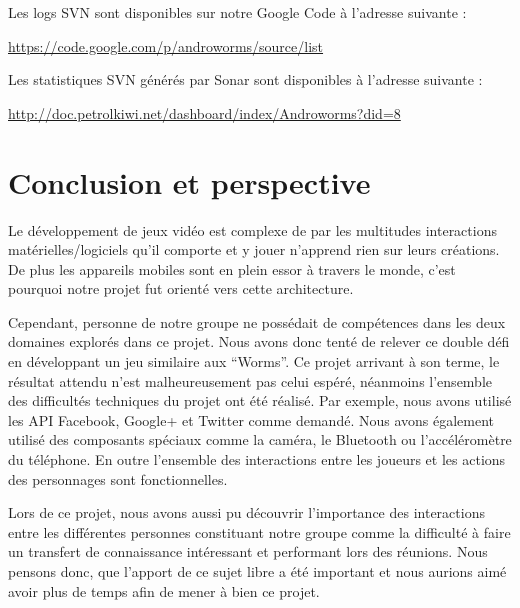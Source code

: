 \documentclass{report}
\begin{document}
Les logs SVN sont disponibles sur notre Google Code à l’adresse suivante :

\url{https://code.google.com/p/androworms/source/list}

\bigskip

Les statistiques SVN générés par Sonar sont disponibles à l’adresse suivante :

\url{http://doc.petrolkiwi.net/dashboard/index/Androworms?did=8}


\newpage

\section{Conclusion et perspective}
\bigskip


Le développement de jeux vidéo est complexe de par les multitudes
interactions matérielles/logiciels qu’il comporte et y jouer n’apprend
rien sur leurs créations. De plus les appareils mobiles sont en plein
essor à travers le monde, c’est pourquoi notre projet fut orienté vers
cette architecture.

Cependant, personne de notre groupe ne possédait de compétences dans
les deux domaines explorés dans ce projet. Nous avons donc tenté de
relever ce double défi en développant un jeu similaire aux “Worms”.
Ce projet arrivant à son terme, le résultat attendu n’est
malheureusement pas celui espéré, néanmoins l’ensemble des difficultés
techniques du projet ont été réalisé. Par exemple, nous avons utilisé
les API Facebook, Google+ et Twitter comme demandé. Nous avons également
utilisé des composants spéciaux comme la caméra, le Bluetooth ou
l’accéléromètre du téléphone. En outre l’ensemble des interactions entre
les joueurs et les actions des personnages sont fonctionnelles. 

Lors de ce projet, nous avons aussi pu découvrir l’importance des
interactions entre les différentes personnes constituant notre groupe
comme la difficulté à faire un transfert de connaissance intéressant et
performant lors des réunions. Nous pensons donc, que l’apport de ce sujet
libre a été important et nous aurions aimé avoir plus de temps afin de
mener à bien ce projet.
\end{document}
